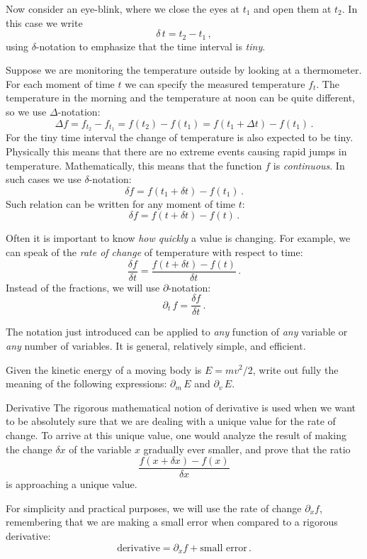 Now consider an eye-blink, where we close the eyes at $t_1$ and open them at $t_2$. In this case we write
\[
\delta\, t = t_2 - t_1\,,
\]
using $\delta$-notation to emphasize that the time interval is \emph{tiny}.

Suppose we are monitoring the temperature outside by looking at a thermometer. For each moment of time $t$ we can specify the measured temperature $f_t$. The temperature in the morning and the temperature at noon can be quite different, so we use $\Delta$-notation:
\[
\Delta f=f_{t_2} - f_{t_1}=f(t_2)-f(t_1)=f(t_1+\Delta t)-f(t_1)\,.
\]
For the tiny time interval the change of temperature is also expected to be tiny. Physically this means that there are no extreme events causing rapid jumps in temperature. Mathematically, this means that the function $f$ is \emph{continuous}. In such cases we use $\delta$-notation:
\[
\delta f=f(t_1+\delta t)-f(t_1)\,.
\]
Such relation can be written for any moment of time $t$:
\[
\delta f=f(t+\delta t)-f(t)\,.
\]

Often it is important to know \emph{how quickly} a value is changing. For example, we can speak of the  \emph{rate of change} of temperature with respect to time:
\[
\frac{\delta f}{\delta t} = \frac{f(t+\delta t)-f(t)}{\delta t}\,.
\]
Instead of the fractions, we will use $\partial$-notation:
\[
\partial_t\,f=\frac{\delta f}{\delta t}\,.
\]

The notation just introduced can be applied to \emph{any} function of \emph{any} variable or \emph{any} number of variables. It is general, relatively simple, and efficient.
\begin{exercise}
	Given the kinetic energy of a moving body is $E = mv^2/2$, write out fully the meaning of the following expressions: $\partial_m\, E$ and $\partial_v\, E$.
\end{exercise}

\begin{mybio}{Derivative}
	The rigorous mathematical notion of derivative is used when we want to be absolutely sure that we are dealing with a unique value for the rate of change. To arrive at this unique value, one would analyze the result of making the change $\delta x$ of the variable $x$ gradually ever smaller, and prove that the ratio
	\[
		\frac{f(x+\delta x)-f(x)}{\delta x}
	\] 
	is approaching a unique value.
	
	For simplicity and practical purposes, we will use the rate of change $\partial_x f$, remembering that we are making a small error when compared to a rigorous derivative:
	\[
	\textrm{derivative} = \partial_x f + \textrm{small error}\,.
	\]
\end{mybio}

